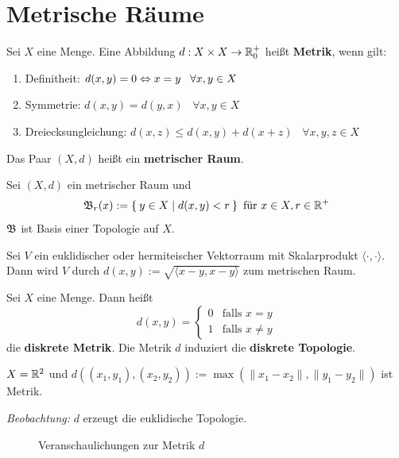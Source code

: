\section{Metrische Räume}
\begin{definition}  
    Sei $X$ eine Menge. Eine Abbildung $d:X\times X \rightarrow \mathbb{R}_0^+$
    heißt \textbf{Metrik}, wenn gilt:

    \begin{enumerate}[label=(\roman*)]
        \item Definitheit:         \tabto{4cm} $d(x,y) = 0 \Leftrightarrow x = y \;\;\; \forall x, y \in X$
        \item Symmetrie:           \tabto{4cm} $d(x,y) = d(y,x) \;\;\; \forall x, y \in X$
        \item Dreiecksungleichung: \tabto{4cm} $d(x,z) \leq d(x,y) + d(x+z) \;\;\; \forall x, y, z \in X$
    \end{enumerate}

    Das Paar $(X, d)$ heißt ein \textbf{metrischer Raum}.
\end{definition}

\begin{bemerkung}
    Sei $(X, d)$ ein metrischer Raum und
    \[\mathfrak{B}_r(x) := \Set{y \in X | d(x,y) < r} \text{ für } x \in X, r \in \mathbb{R}^+\]
    $\mathfrak{B}$ ist Basis einer Topologie auf $X$.
\end{bemerkung}

\begin{beispiel}
    Sei $V$ ein euklidischer oder hermiteischer Vektorraum mit Skalarprodukt
    $\langle \cdot , \cdot \rangle$.
    Dann wird $V$ durch $d(x,y) := \sqrt{\langle x-y, x-y \rangle}$ zum metrischen Raum.
\end{beispiel}

\begin{beispiel}  
    Sei $X$ eine Menge. Dann heißt
    \[d(x,y) = \begin{cases}
    0 & \text{falls } x=y\\
    1 & \text{falls } x \neq y
    \end{cases}\]
    die \textbf{diskrete Metrik}. Die Metrik $d$ induziert die 
    \textbf{diskrete Topologie}.
\end{beispiel}

\begin{beispiel}
    $X = \mathbb{R}^2$ und $d\left ((x_1, y_1), (x_2, y_2)\right ) := \max(\|x_1 - x_2\|, \|y_1 - y_2\|)$
    ist Metrik.

    \emph{Beobachtung:} $d$ erzeugt die euklidische Topologie.

    \begin{figure}[ht]
        \centering
        \subfloat[$\fB_r(0)$]{
            
            \label{fig:open-square}
        }%
        \label{fig:metrik}
        \caption{Veranschaulichungen zur Metrik $d$}
    \end{figure}

\end{beispiel}

